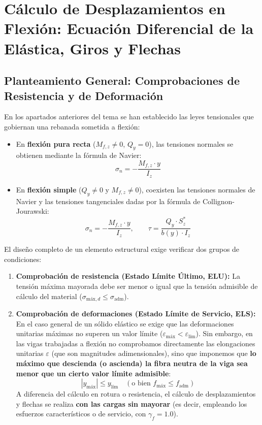 \section{Cálculo de Desplazamientos en Flexión: Ecuación Diferencial de la Elástica, Giros y Flechas}

\subsection{Planteamiento General: Comprobaciones de Resistencia y de Deformación}

En los apartados anteriores del tema se han establecido las leyes tensionales que gobiernan una rebanada sometida a flexión:
\begin{itemize}
    \item En \textbf{flexión pura recta} ($M_{f,z} \neq 0$, $Q_y = 0$), las tensiones normales se obtienen mediante la fórmula de Navier:
          \begin{equation}
              \sigma_n = -\frac{M_{f,z} \cdot y}{I_z}
          \end{equation}
    \item En \textbf{flexión simple} ($Q_y \neq 0$ y $M_{f,z} \neq 0$), coexisten las tensiones normales de Navier y las tensiones tangenciales dadas por la fórmula de Collignon-Jourawski:
          \begin{equation}
              \sigma_n = -\frac{M_{f,z} \cdot y}{I_z}, \qquad \tau = \frac{Q_y \cdot S_z^*}{b(y) \cdot I_z}
          \end{equation}
\end{itemize}

El diseño completo de un elemento estructural exige verificar dos grupos de condiciones:
\begin{enumerate}
    \item \textbf{Comprobación de resistencia (Estado Límite Último, ELU):} La tensión máxima mayorada debe ser menor o igual que la tensión admisible de cálculo del material ($\sigma_{\text{máx},d} \le \sigma_{\text{adm}}$).
    \item \textbf{Comprobación de deformaciones (Estado Límite de Servicio, ELS):} En el caso general de un sólido elástico se exige que las deformaciones unitarias máximas no superen un valor límite ($\varepsilon_{\text{máx}} < \varepsilon_{\text{lím}}$). Sin embargo, en las vigas trabajadas a flexión no comprobamos directamente las elongaciones unitarias $\varepsilon$ (que son magnitudes adimensionales), sino que imponemos que \textbf{lo máximo que descienda (o ascienda) la fibra neutra de la viga sea menor que un cierto valor límite admisible}:
          \begin{equation}
              |y_{\text{máx}}| \le y_{\text{lím}} \quad (\text{o bien } f_{\text{máx}} \le f_{\text{adm}})
          \end{equation}
          A diferencia del cálculo en rotura o resistencia, el cálculo de desplazamientos y flechas se realiza \textbf{con las cargas sin mayorar} (es decir, empleando los esfuerzos característicos o de servicio, con $\gamma_f = 1.0$).
\end{enumerate}

